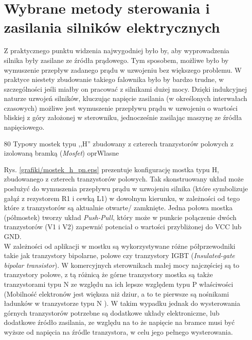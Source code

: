 \section{Wybrane metody sterowania i zasilania silników elektrycznych}

Z praktycznego punktu widzenia najwygodniej było by, aby wyprowadzenia silnika były zasilane ze źródła prądowego. Tym sposobem, możliwe było by wymuszenie przepływ zadanego prądu w uzwojeniu bez większego problemu. W praktyce niestety zbudowanie takiego falownika było by bardzo trudne, w szczególności jeśli miałby on pracować z silnikami dużej mocy. Dzięki indukcyjnej naturze uzwojeń silników, kluczując napięcie zasilania (w określonych interwałach czasowych) możliwe jest wymuszenie przepływu prądu w uzwojeniu o wartości bliskiej z góry założonej w sterowniku, jednocześnie zasilając maszynę ze źródła napięciowego.

	{80}
	{Typowy mostek typu ,,H'' zbudowany z czterech tranzystorów polowych z izolowaną bramką ({\it Mosfet})}
	{oprWlasne}

Rys. \ref{grafiki/mostek_h_pn.eps} prezentuje konfigurację mostka typu H, zbudowanego z czterech tranzystorów polowych. Tak skonstruowany układ może posłużyć do wymuszenia przepływu prądu w uzwojeniu silnika (które symbolizuje gałąź z rezystorem R1 i cewką L1) w dowolnym kierunku, w zależności od tego które z tranzystorów są aktualnie otwarte/ zamknięte. Jedna połowa mostka (półmostek) tworzy układ {\it Push-Pull}, który może w punkcie połączenie dwóch tranzystorów (V1 i V2) zapewnić potenciał o wartości przybliżonej do VCC lub GND. \\

W zależności od aplikacji w mostku są wykorzystywane różne półprzewodniki takie jak tranzystory bipolarne, polowe czy tranzystory IGBT ({\it Insulated-gate bipolar transistor}). W komercyjnych sterownikach małej mocy najczęściej są to tranzystory polowe, z tą różnicą że górne tranzystory mostka są także tranzystorami typu N ze względu na ich lepsze względem typu P właściwości (Mobilność elektronów jest większa niż dziur, a to te pierwsze są nośnikami ładunków w tranzystorze typu N \cite{tietze}). W takim wypadku jednak do wysterowania górnych tranzystorów potrzebne są dodatkowe układy elektroniczne, lub dodatkowe źródło zasilania, ze względu na to że napięcie na bramce musi być wyższe od napięcia na źródle tranzystora, w celu jego pełnego wysterowania. \\

